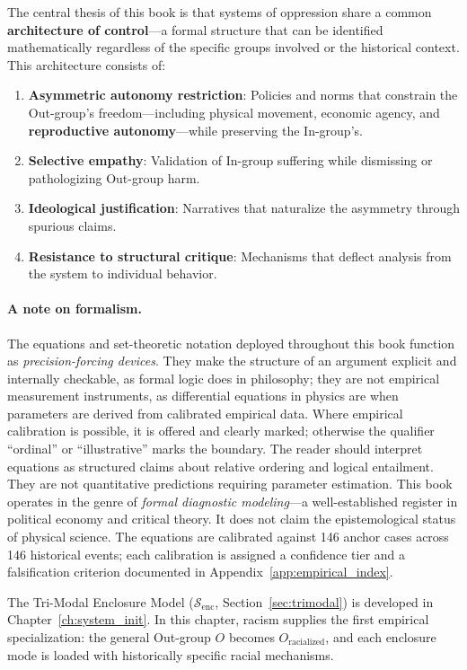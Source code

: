 The central thesis of this book is that systems of oppression share a common \textbf{architecture of control}---a formal structure that can be identified mathematically regardless of the specific groups involved or the historical context. This architecture consists of:
\begin{enumerate}
    \item \textbf{Asymmetric autonomy restriction}: Policies and norms that constrain the Out-group's freedom---including physical movement, economic agency, and \textbf{reproductive autonomy}---while preserving the In-group's.
    \item \textbf{Selective empathy}: Validation of In-group suffering while dismissing or pathologizing Out-group harm.
    \item \textbf{Ideological justification}: Narratives that naturalize the asymmetry through spurious claims.
    \item \textbf{Resistance to structural critique}: Mechanisms that deflect analysis from the system to individual behavior.
\end{enumerate}

\paragraph{A note on formalism.}
The equations and set-theoretic notation deployed throughout this book function as \textit{precision-forcing devices}. They make the structure of an argument explicit and internally checkable, as formal logic does in philosophy; they are not empirical measurement instruments, as differential equations in physics are when parameters are derived from calibrated empirical data. Where empirical calibration is possible, it is offered and clearly marked; otherwise the qualifier ``ordinal'' or ``illustrative'' marks the boundary. The reader should interpret equations as structured claims about relative ordering and logical entailment. They are not quantitative predictions requiring parameter estimation. This book operates in the genre of \textit{formal diagnostic modeling}---a well-established register in political economy and critical theory. It does not claim the epistemological status of physical science.
The equations are calibrated against 146 anchor cases across 146 historical events; each calibration is assigned a confidence tier and a falsification criterion documented in Appendix~\ref{app:empirical_index}.

The Tri-Modal Enclosure Model ($\mathcal{S}_{\text{enc}}$,
Section~\ref{sec:trimodal}) is developed in Chapter~\ref{ch:system_init}. In
this chapter, racism supplies the first empirical specialization: the general
Out-group $O$ becomes $O_{\text{racialized}}$, and each enclosure mode is loaded
with historically specific racial mechanisms.

